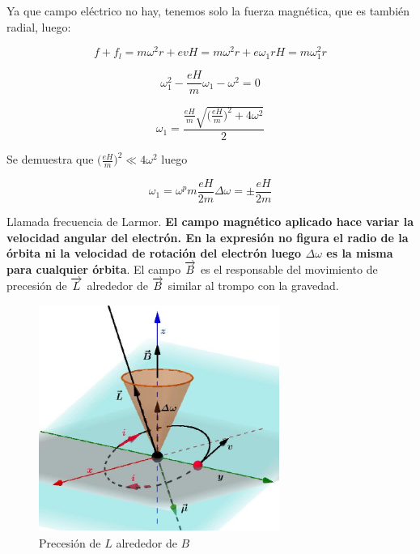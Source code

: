 Ya que campo eléctrico no hay, tenemos solo la fuerza magnética, que es también radial, luego:

\begin{equation}
  f+f_{l}= m\omega^{2}r+ evH = m\omega^{2}r+ e\omega_{1}rH=m\omega_{1}^{2}r
\end{equation}

\begin{equation}
  \omega_{1}^{2}-\frac{eH}{m}\omega_{1}-\omega^{2} =0
\end{equation}

\begin{equation}
	\omega_{1}=\frac{\frac{eH}{m}\sqrt{\big(\frac{eH}{m}\big)^{2}+4\omega^{2}}}{2}
\end{equation}

Se demuestra que $\big(\frac{eH}{m}\big)^{2}\ll 4\omega^{2}$ luego

\begin{equation}
	\omega_{1}= \omega^pm\frac{eH}{2m}\Delta\omega=\pm\frac{eH}{2m}
\end{equation}

Llamada frecuencia de Larmor. \textbf{El campo magnético aplicado hace variar la velocidad angular del electrón. En la expresión no figura el radio de la órbita ni la velocidad de rotación del electrón luego $\Delta\omega$ es la misma para cualquier órbita}. El campo $\overrightarrow{B}$ es el responsable del movimiento de precesión de $\overrightarrow{L}$ alrededor de $\overrightarrow{B}$ similar al trompo con la gravedad.

\begin{figure}[H]
    \centering
    \includegraphics[width=0.7\textwidth]{./Figures/fig_s10}
	\caption{Precesión de $L$ alrededor de $B$}
	\label{fig:s10}
\end{figure}

